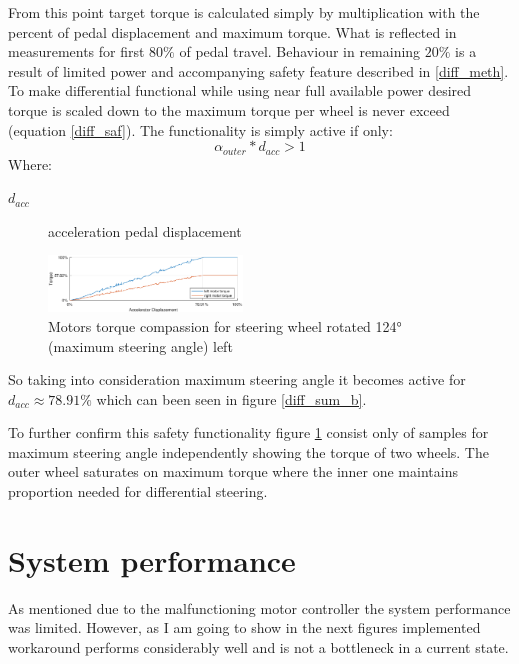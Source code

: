 From this point target torque is calculated simply by multiplication with the percent of pedal displacement and maximum torque. What is reflected in measurements for first $80\%$ of pedal travel. 
Behaviour in remaining $20\%$ is a result of limited power and accompanying safety feature described in \ref{diff_meth}. To make differential functional while using near full available power desired torque is scaled down to the maximum torque per wheel is never exceed (equation \ref{diff_saf}).
The functionality is simply active if only: \begin{equation*}
    \alpha_{outer} * d_{acc}>1
\end{equation*} 
Where:
\begin{description}
    \item[$d_{acc}$] acceleration pedal displacement
\end{description}

\begin{figure}
    \vspace{-20pt}
    \centering
    \includegraphics[width=0.46\textwidth]{figures/diff_123}
    \caption{Motors torque compassion for steering wheel rotated 124° (maximum steering angle) left}
    \label{diff_123}
    \vspace{-20pt}
\end{figure}
So taking into consideration maximum steering angle it becomes active for $d_{acc} \approx 78.91\%$ which can been seen in figure \ref{diff_sum_b}.

To further confirm this safety functionality figure \ref{diff_123} consist only of samples for maximum steering angle independently showing the torque of two wheels. The outer wheel saturates on maximum torque where the inner one maintains proportion needed for differential steering.







\section{System performance}
As mentioned due to the malfunctioning motor controller the system performance was limited. However, as I am going to show in the next figures implemented workaround performs considerably well and is not a bottleneck in a current state.

